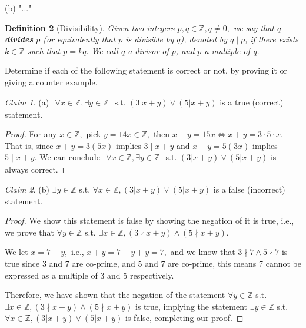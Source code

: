 \documentclass{homework}
\theoremstyle{remark}
\newtheorem*{claim}{Claim}
\newcommand{\?}{\stackrel{?}{=}}
\begin{document}
(b) "..."



\newpage
\question \textbf{Definition 2} (Divisibility). \textit{Given two integers $p,q\in\mathbb{Z},q\neq 0,$ we say that $q$ \textbf{divides} $p$ (or equivalently that $p$ is divisible by $q$), denoted by $q\mid p$, if there exists $k\in\mathbb{Z}$ such that $p=kq.$ We call $q$ a divisor of $p$, and $p$ a multiple of q.}

Determine if each of the following statement is correct or not, by proving it or giving a counter example. 

\begin{claim}
    (a) $\begin{aligned}\forall x\in\mathbb{Z},\exists y\in\mathbb{Z}\end{aligned}$ s.t. $(3|x+y)\lor(5|x+y)$ is a true (correct) statement. 
\end{claim}

\begin{proof}
    For any $x\in\mathbb{Z},$ pick $y=14x\in\mathbb{Z},$ then $x+y=15x \iff x+y=3\cdot5\cdot x.$ That is, since $x+y=3(5x)$ implies $3\mid x+y$ and $x+y=5(3x)$ implies $5\mid x+y.$ We can conclude $\begin{aligned}\forall x\in\mathbb{Z},\exists y\in\mathbb{Z}\end{aligned}$ s.t. $(3|x+y)\lor(5|x+y)$ is always correct. 
\end{proof}

\begin{claim}
    (b) $\exists y\in\mathbb{Z}$ s.t. $\forall x \in \mathbb{Z},(3|x+y)\lor(5|x+y)$ is a false (incorrect) statement. 
\end{claim}

\begin{proof}
    We show this statement is false by showing the negation of it is true, i.e., we prove that $\forall y \in\mathbb{Z}$ s.t. $\exists x\in\mathbb{Z}, (3\nmid x+y)\land(5\nmid x+y)$.

    We let $x=7-y,$ i.e., $x+y=7-y+y=7,$ and we know that $3\nmid7\land5\nmid7$ is true since 3 and 7 are co-prime, and 5 and 7 are co-prime, this means 7 cannot be expressed as a multiple of 3 and 5 respectively. 
    
    Therefore, we have shown that the negation of the statement  $\forall y \in\mathbb{Z}$ s.t. $\exists x\in\mathbb{Z}, (3\nmid x+y)\land(5\nmid x+y)$ is true, implying the statement $\exists y\in\mathbb{Z}$ s.t. $\forall x \in \mathbb{Z},(3|x+y)\lor(5|x+y)$ is false, completing our proof.  
\end{proof}
\end{document}
